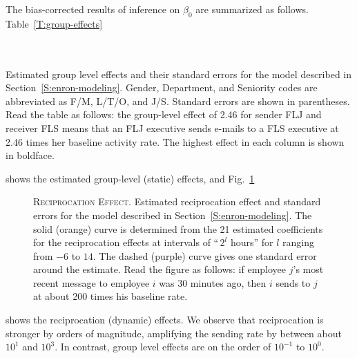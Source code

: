 \documentclass[final]{statsoc}
\begin{document}
The bias-corrected results of inference on $\beta_0$ are summarized as
follows.  Table~\ref{T:group-effects}
\begin{table}
    \tiny
    \makebox[\textwidth]{}
    \\
    \\
    \caption{
        Estimated group level effects and their standard errors for the
        model described in Section~\ref{S:enron-modeling}.  Gender,
        Department, and Seniority codes are abbreviated as F/M, L/T/O,
        and J/S.  Standard errors are shown in parentheses.  Read
        the table as follows: the group-level effect of 2.46 for sender
        FLJ and receiver FLS means that an FLJ executive sends e-mails to a
        FLS executive at 2.46 times her baseline activity rate.  The highest
        effect in each column is shown in boldface.
    }
    \label{T:group-effects}
\end{table}
shows the estimated group-level (static) effects, and
Fig.~\ref{F:reciprocation}
\begin{figure}[t]
    \centering
    \caption{
        \textsc{Reciprocation Effect.}
        Estimated reciprocation effect and standard errors for the
        model described in Section~\ref{S:enron-modeling}.  The solid
        (orange) curve is determined from the 21 estimated coefficients
        for the reciprocation effects at intervals of ``\,$2^l$ hours''
        for $l$ ranging from $-6$ to $14$.  The dashed (purple) curve gives
        one standard error around the estimate.  Read the figure as follows:
        if employee $j$'s most recent message to employee $i$ was 30 minutes
        ago, then $i$ sends to $j$ at about 200 times his baseline rate.
    }\label{F:reciprocation}
\end{figure}
shows the reciprocation (dynamic) effects.  We observe that reciprocation
is stronger by orders of magnitude, amplifying the sending rate by between
about $10^1$ and $10^3$.  In contrast, group level effects are on the order
of $10^{-1}$ to $10^0$.
\end{document}
